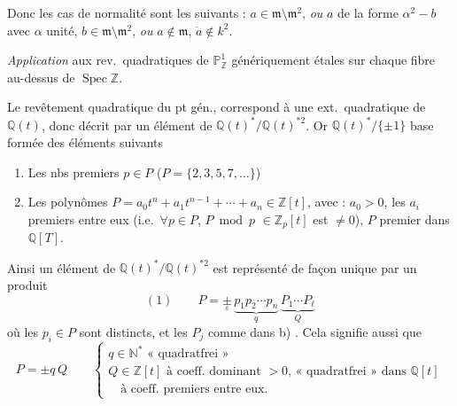 \documentclass[11pt,a4paper]{article}
\begin{document}
Donc les cas de normalité sont les suivants :
$a \in \mathfrak{m} \setminus \mathfrak{m}^2$, \emph{ou} $a$ de la forme
$\alpha^2 - b$ avec $\alpha$ unité, $b \in \mathfrak{m} \setminus \mathfrak{m}^2$,
\emph{ou} $a \notin \mathfrak{m}$, $\dot a \notin k^2$.

\emph{Application} aux rev.\ quadratiques de $\mathbb{P}^1_{\mathbb{Z}}$
 génériquement  étales
sur chaque fibre \struck{\ill{}} au-dessus de $\operatorname{Spec} \mathbb{Z}$.

Le revêtement  \struck{\ill{}} quadratique du pt
gén., correspond à une ext.\ quadratique de $\mathbb{Q}(t)$, donc décrit par
un élément de $\mathbb{Q}(t)^*/\mathbb{Q}(t)^{*2}$. Or $\mathbb{Q}(t)^*/\{\pm 1\}$
 base formée des éléments suivants
\begin{enumerate}
\item[a)] Les nbs premiers $p \in P$ \quad ($P = \{2, 3, 5, 7, \ldots\}$)
\item[b)] Les polynômes $P = a_0 t^n + a_1 t^{n-1} + \cdots + a_n \in \mathbb{Z}[t]$,
avec : $a_0 > 0$, les $a_i$ premiers entre eux (i.e.\ $\forall p \in P$, $P \bmod p$
$\in \mathbb{Z}_p[t]$ est $\neq 0$), $P$ premier dans $\mathbb{Q}[T]$.
\end{enumerate}
Ainsi un élément de $\mathbb{Q}(t)^*/\mathbb{Q}(t)^{*2}$ est représenté de façon
unique par un produit
\[
(1)\qquad P = \underset{\varepsilon}{\pm}\, \underbrace{p_1 p_2 \cdots p_n}_{q}\,
\underbrace{P_1 \cdots P_\ell}_{Q}
\]
où les $p_i \in P$ sont distincts, et les $P_j$ comme dans b) .
Cela signifie aussi que
\[
P = \pm q\, Q \qquad
\begin{cases}
q \in \mathbb{N}^* \text{ « quadratfrei »} \\
Q \in \mathbb{Z}[t] \text{ à coeff.\ dominant } > 0 \text{, « quadratfrei » dans } \mathbb{Q}[t] \\
\quad \text{à coeff.\ premiers entre eux.}
\end{cases}
\]
\end{document}
